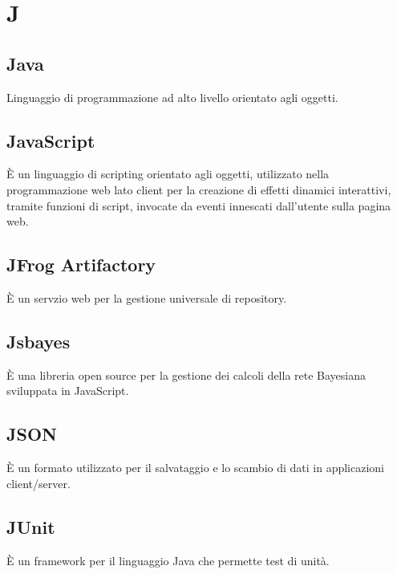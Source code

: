 \section*{J}

\subsection{Java}
Linguaggio di programmazione ad alto livello orientato agli oggetti. 

\subsection{JavaScript}
È un linguaggio di scripting orientato agli oggetti, utilizzato nella programmazione web lato client per la creazione di effetti dinamici interattivi, tramite funzioni di script, invocate da eventi innescati dall'utente sulla pagina web.

\subsection{JFrog Artifactory} 
È un servzio web per la gestione universale di repository.

\subsection{Jsbayes}
È una libreria open source per la gestione dei calcoli della rete Bayesiana sviluppata in JavaScript.

\subsection{JSON}
È un formato utilizzato per il salvataggio e lo scambio di dati in applicazioni client/server.

\subsection{JUnit}
È un framework per il linguaggio Java che permette test di unità.